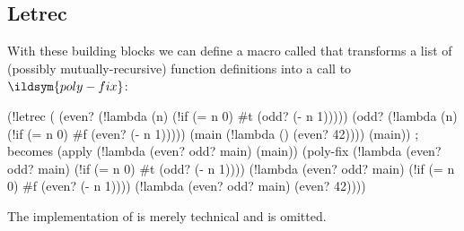 \subsection{Letrec}
\label{letrec}
With these building blocks we can define a
macro called  that transforms a list of (possibly mutually-recursive)
function definitions into a call to \(\ildsym{poly-fix}\):
\begin{listingbox}\begin{ildcode}
(!letrec (
    (even? (!lambda (n)
      (!if (= n 0) #t (odd? (- n 1)))))
    (odd? (!lambda (n)
      (!if (= n 0) #f (even? (- n 1)))))
    (main (!lambda () (even? 42))))
  (main))
; becomes
(apply
  (!lambda (even? odd? main) (main))
  (poly-fix
    (!lambda (even? odd? main)
      (!if (= n 0) #t (odd? (- n 1))))
    (!lambda (even? odd? main)
      (!if (= n 0) #f (even? (- n 1))))
    (!lambda (even? odd? main) (even? 42))))
\end{ildcode}\end{listingbox}
\label{letrec-expansion}
The implementation of  is merely technical and is omitted.

